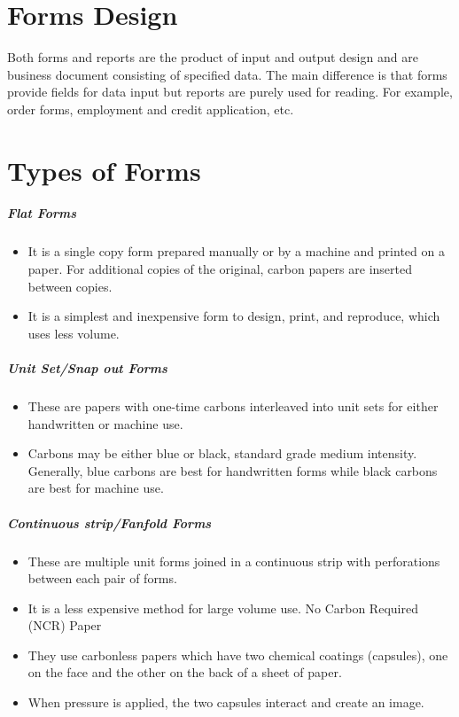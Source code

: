 \documentclass[a4paper,12pt]{report}
\begin{document}
\section{Forms Design}
Both forms and reports are the product of input and output design and are business document consisting of specified data. The main difference is that forms provide fields for data input but reports are purely used for reading. For example, order forms, employment and credit application, etc.
\section{Types of Forms}
\subparagraph{Flat Forms}
\begin{itemize}
	\item	It is a single copy form prepared manually or by a machine and printed on a paper. For additional copies of the original, carbon papers are inserted between copies.
	\item	It is a simplest and inexpensive form to design, print, and reproduce, which uses less volume.
\end{itemize}
\subparagraph{Unit Set/Snap out Forms}
\begin{itemize}
	\item	These are papers with one-time carbons interleaved into unit sets for either handwritten or machine use.
	\item	Carbons may be either blue or black, standard grade medium intensity. Generally, blue carbons are best for handwritten forms while black carbons are best for machine use.
\end{itemize}
\subparagraph{Continuous strip/Fanfold Forms}
\begin{itemize}
	\item	These are multiple unit forms joined in a continuous strip with perforations between each pair of forms.
	\item	It is a less expensive method for large volume use.
	No Carbon Required (NCR) Paper
	\item	They use carbonless papers which have two chemical coatings (capsules), one on the face and the other on the back of a sheet of paper.
	\item	When pressure is applied, the two capsules interact and create an image.
\end{itemize}
\newpage
\end{document}
